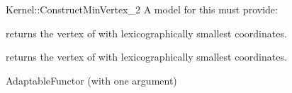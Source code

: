 \begin{ccRefFunctionObjectConcept}{Kernel::ConstructMinVertex_2}
A model for this must provide:


 {returns the vertex of
   with lexicographically smallest coordinates.}

 {returns the vertex of
   with lexicographically smallest coordinates.}

\ccRefines
AdaptableFunctor (with one argument)

\ccSeeAlso
{}\\

\end{ccRefFunctionObjectConcept}
